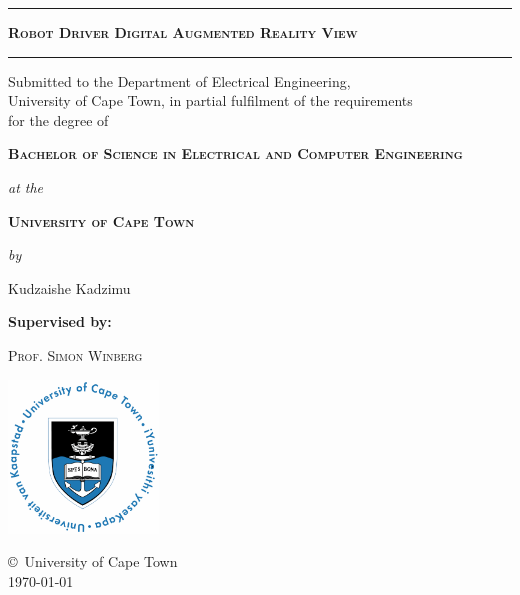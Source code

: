 \documentclass[a4paper, 12pt, onecolumn, twoside]{report}
\begin{document}
\begin{titlepage}
\begin{center}
\vspace*{-1cm} %

\hrule
\vspace*{0.3cm}

{\Large\bfseries\scshape Robot Driver Digital Augmented Reality View}

\vspace*{0.4cm}
\hrule
\vspace*{0.5cm}

{\small
\textsf{Submitted to the Department of Electrical Engineering,\\
University of Cape Town, in partial fulfilment of the requirements\\
for the degree of}
\vspace*{0.3cm}

{\scshape\bfseries Bachelor of Science in Electrical and Computer Engineering}
\vspace*{0.3cm}

\emph{at the}
\vspace*{0.3cm}

{\scshape\bfseries University of Cape Town}
\vspace*{0.3cm}

\emph{by}
\vspace*{0.3cm}

{\textsf{Kudzaishe Kadzimu}}
}

\vspace*{0.3cm}
{\textsf{\bfseries Supervised by:}}
\vspace*{0.3cm}

{\scshape Prof. Simon Winberg}

\vfill
\includegraphics[width=4cm]{uctlogomain.png}
\vspace*{0.3cm}

\copyright\ University of Cape Town \\
{\textsf \today}
\end{center}
\end{titlepage}
\end{document}
